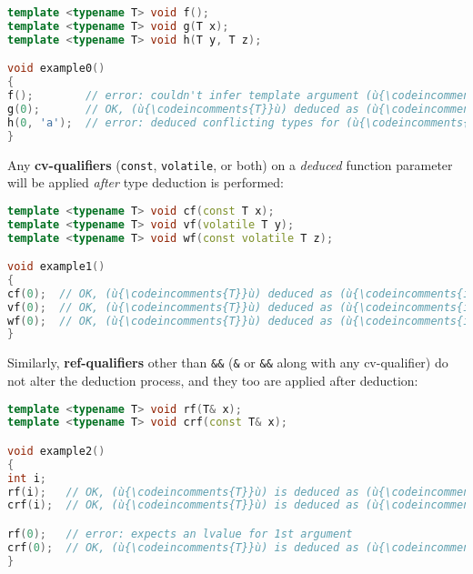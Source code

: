 \begin{lstlisting}[language=C++]
template <typename T> void f();
template <typename T> void g(T x);
template <typename T> void h(T y, T z);

void example0()
{
f();        // error: couldn't infer template argument (ù{\codeincomments{T}}ù)
g(0);       // OK, (ù{\codeincomments{T}}ù) deduced as (ù{\codeincomments{int}}ù) from literal (ù{\codeincomments{0}}ù) -- (ù{\codeincomments{x}}ù) is an (ù{\codeincomments{int}}ù).
h(0, 'a');  // error: deduced conflicting types for (ù{\codeincomments{T}}ù) ((ù{\codeincomments{int}}ù) vs. (ù{\codeincomments{char}}ù))
}
\end{lstlisting}

\noindent Any \textbf{cv-qualifiers} (\texttt{const}, \texttt{volatile}, or both)
on a \emph{deduced} function parameter will be applied \emph{after} type
deduction is performed:

\begin{lstlisting}[language=C++]
template <typename T> void cf(const T x);
template <typename T> void vf(volatile T y);
template <typename T> void wf(const volatile T z);

void example1()
{
cf(0);  // OK, (ù{\codeincomments{T}}ù) deduced as (ù{\codeincomments{int}}ù) -- (ù{\codeincomments{x}}ù) is a (ù{\codeincomments{const int}}ù).
vf(0);  // OK, (ù{\codeincomments{T}}ù) deduced as (ù{\codeincomments{int}}ù) -- (ù{\codeincomments{y}}ù) is a (ù{\codeincomments{volatile int}}ù).
wf(0);  // OK, (ù{\codeincomments{T}}ù) deduced as (ù{\codeincomments{int}}ù) -- (ù{\codeincomments{z}}ù) is a (ù{\codeincomments{const}}ù) (ù{\codeincomments{volatile}}ù) (ù{\codeincomments{int}}ù).
}
\end{lstlisting}

\noindent Similarly, \textbf{ref-qualifiers} other than \texttt{\&\&}
(\texttt{\&} or \texttt{\&\&} along with any cv-qualifier) do not
alter the deduction process, and they too are applied after deduction:

\begin{lstlisting}[language=C++]
template <typename T> void rf(T& x);
template <typename T> void crf(const T& x);

void example2()
{
int i;
rf(i);   // OK, (ù{\codeincomments{T}}ù) is deduced as (ù{\codeincomments{int}}ù) -- (ù{\codeincomments{x}}ù) is an (ù{\codeincomments{int\&}}ù).
crf(i);  // OK, (ù{\codeincomments{T}}ù) is deduced as (ù{\codeincomments{int}}ù) -- (ù{\codeincomments{x}}ù) is a (ù{\codeincomments{const int\&}}ù).

rf(0);   // error: expects an lvalue for 1st argument
crf(0);  // OK, (ù{\codeincomments{T}}ù) is deduced as (ù{\codeincomments{int}}ù) -- (ù{\codeincomments{x}}ù) is a (ù{\codeincomments{const int\&}}ù).
}
\end{lstlisting}


